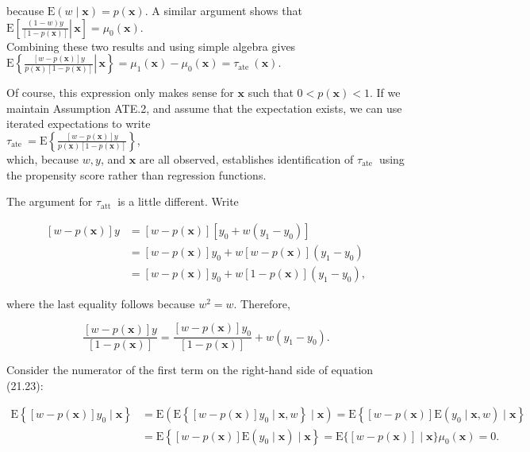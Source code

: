 \documentclass[10pt]{article}
\begin{document}
because $\mathrm{E}(w \mid \mathbf{x})=p(\mathbf{x})$. A similar argument shows that\\
$\mathrm{E}\left[\left.\frac{(1-w) y}{[1-p(\mathbf{x})]} \right\rvert\, \mathbf{x}\right]=\mu_{0}(\mathbf{x})$.\\
Combining these two results and using simple algebra gives\\
$\mathrm{E}\left\{\left.\frac{[w-p(\mathbf{x})] y}{p(\mathbf{x})[1-p(\mathbf{x})]} \right\rvert\, \mathbf{x}\right\}=\mu_{1}(\mathbf{x})-\mu_{0}(\mathbf{x})=\tau_{\text {ate }}(\mathbf{x})$.

Of course, this expression only makes sense for $\mathbf{x}$ such that $0<p(\mathbf{x})<1$. If we maintain Assumption ATE.2, and assume that the expectation exists, we can use iterated expectations to write\\
$\tau_{\text {ate }}=\mathrm{E}\left\{\frac{[w-p(\mathbf{x})] y}{p(\mathbf{x})[1-p(\mathbf{x})]}\right\}$,\\
which, because $w, y$, and $\mathbf{x}$ are all observed, establishes identification of $\tau_{\text {ate }}$ using the propensity score rather than regression functions.

The argument for $\tau_{\text {att }}$ is a little different. Write

$$
\begin{aligned}
{[w-p(\mathbf{x})] y } & =[w-p(\mathbf{x})]\left[y_{0}+w\left(y_{1}-y_{0}\right)\right] \\
& =[w-p(\mathbf{x})] y_{0}+w[w-p(\mathbf{x})]\left(y_{1}-y_{0}\right) \\
& =[w-p(\mathbf{x})] y_{0}+w[1-p(\mathbf{x})]\left(y_{1}-y_{0}\right),
\end{aligned}
$$

where the last equality follows because $w^{2}=w$. Therefore,


\begin{equation*}
\frac{[w-p(\mathbf{x})] y}{[1-p(\mathbf{x})]}=\frac{[w-p(\mathbf{x})] y_{0}}{[1-p(\mathbf{x})]}+w\left(y_{1}-y_{0}\right) . \tag{21.23}
\end{equation*}


Consider the numerator of the first term on the right-hand side of equation (21.23):

$$
\begin{aligned}
\mathrm{E}\left\{[w-p(\mathbf{x})] y_{0} \mid \mathbf{x}\right\} & =\mathrm{E}\left(\mathrm{E}\left\{[w-p(\mathbf{x})] y_{0} \mid \mathbf{x}, w\right\} \mid \mathbf{x}\right)=\mathrm{E}\left\{[w-p(\mathbf{x})] \mathrm{E}\left(y_{0} \mid \mathbf{x}, w\right) \mid \mathbf{x}\right\} \\
& =\mathrm{E}\left\{[w-p(\mathbf{x})] \mathrm{E}\left(y_{0} \mid \mathbf{x}\right) \mid \mathbf{x}\right\}=\mathrm{E}\{[w-p(\mathbf{x})] \mid \mathbf{x}\} \mu_{0}(\mathbf{x})=0 .
\end{aligned}
$$
\end{document}
